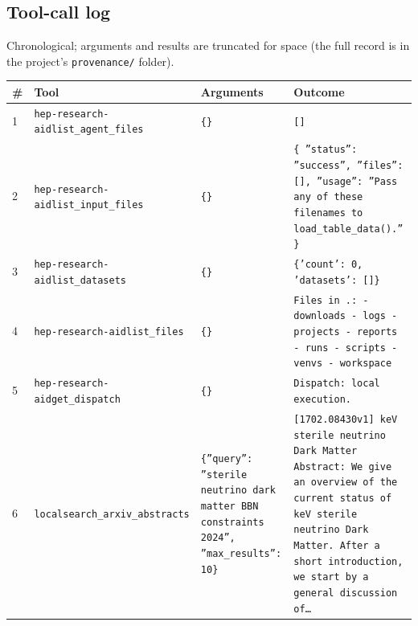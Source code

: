 \documentclass[11pt,a4paper]{article}
\begin{document}
\subsection{Tool-call log}
Chronological; arguments and results are truncated for space (the full record is in the project's \texttt{provenance/} folder).
\begin{longtable}{@{}p{}p{}p{}p{}@{}}
\toprule \# & Tool & Arguments & Outcome \\ \midrule \endhead
1 & \texttt{hep-research-aid}\newline\texttt{list\_\allowbreak{}agent\_\allowbreak{}files} & \texttt{\{\}\allowbreak{}} & \texttt{[]\allowbreak{}} \\
2 & \texttt{hep-research-aid}\newline\texttt{list\_\allowbreak{}input\_\allowbreak{}files} & \texttt{\{\}\allowbreak{}} & \texttt{\{   ''status'':\allowbreak{} ''success'',\allowbreak{}   ''files'':\allowbreak{} []\allowbreak{},\allowbreak{}   ''usage'':\allowbreak{} ''Pass any of these filenames to load\_\allowbreak{}table\_\allowbreak{}data()\allowbreak{}.'' \}\allowbreak{}} \\
3 & \texttt{hep-research-aid}\newline\texttt{list\_\allowbreak{}datasets} & \texttt{\{\}\allowbreak{}} & \texttt{\{'count':\allowbreak{} 0,\allowbreak{} 'datasets':\allowbreak{} []\allowbreak{}\}\allowbreak{}} \\
4 & \texttt{hep-research-aid}\newline\texttt{list\_\allowbreak{}files} & \texttt{\{\}\allowbreak{}} & \texttt{Files in .:\allowbreak{}   - downloads   - logs   - projects   - reports   - runs   - scripts   - venvs   - workspace} \\
5 & \texttt{hep-research-aid}\newline\texttt{get\_\allowbreak{}dispatch} & \texttt{\{\}\allowbreak{}} & \texttt{Dispatch:\allowbreak{} local execution.} \\
6 & \texttt{local}\newline\texttt{search\_\allowbreak{}arxiv\_\allowbreak{}abstracts} & \texttt{\{''query'':\allowbreak{} ''sterile neutrino dark matter BBN constraints 2024'',\allowbreak{} ''max\_\allowbreak{}results'':\allowbreak{} 10\}\allowbreak{}} & \texttt{[1702.08430v1]\allowbreak{} keV sterile neutrino Dark Matter Abstract:\allowbreak{} We give an overview of the current status of keV sterile neutrino Dark Matter. After a short introduction,\allowbreak{} we start by a general discussion of\ldots{}\allowbreak{}} \\

\end{longtable}
\end{document}
